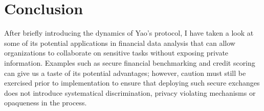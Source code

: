 \documentclass[12pt]{article}
\begin{document}
\section{Conclusion}\label{sec:conclusions}

After briefly introducing the dynamics of Yao's protocol, I have taken a look at some of its potential applications in financial data analysis that can allow organizations to collaborate on sensitive tasks without exposing private information. Examples such as secure financial benchmarking and credit scoring can give us a taste of its potential advantages; however, caution must still be exercised prior to implementation to ensure that deploying such secure exchanges does not introduce systematical discrimination, privacy violating mechanisms or opaqueness in the process.

{\footnotesize

}
\end{document}
